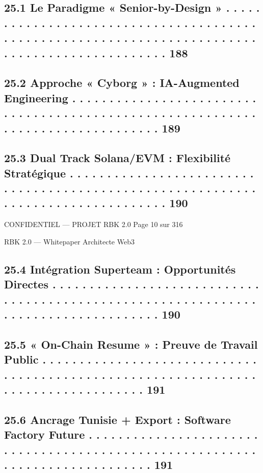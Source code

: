 \documentclass[12pt,landscape,a4paper]{article}
\newenvironment{confidential}
{\begin{tcolorbox}[
    colback=rbkred!5!white,
    colframe=rbkred!75!black,
    title=CONFIDENTIEL,
    fonttitle=\bfseries\color{white},
    coltitle=rbkred!75!black,
    breakable,
    enhanced,
    frame hidden,
    borderline west={2pt}{0pt}{rbkred!75!black}
]}
{\end{tcolorbox}}
\begin{document}
\subsection{25.1    Le Paradigme « Senior-by-Design » . . . . . . . . . . . . . . . . . . . . . . . . . . . . . . . . . . . . . . . . . . . . . . . . . . . . . . . . . . . . . . . . . . . . . . . . . . . . . . . . . . . . . . . . . . . . . . . 188}
\subsection{25.2    Approche « Cyborg » : IA-Augmented Engineering . . . . . . . . . . . . . . . . . . . . . . . . . . . . . . . . . . . . . . . . . . . . . . . . . . . . . . . . . . . . . . . . . . . . . . . . . . . . . . . . 189}
\subsection{25.3    Dual Track Solana/EVM : Flexibilité Stratégique . . . . . . . . . . . . . . . . . . . . . . . . . . . . . . . . . . . . . . . . . . . . . . . . . . . . . . . . . . . . . . . . . . . . . . . . . . . . . . . . . 190}
\vspace{0.5em}
\vspace{0.5em}
\begin{confidential}CONFIDENTIEL — PROJET RBK 2.0                                                                                  Page 10 sur 316\end{confidential}
RBK 2.0 — Whitepaper Architecte Web3\\
\vspace{0.5em}
\vspace{0.5em}
\subsection{25.4    Intégration Superteam : Opportunités Directes . . . . . . . . . . . . . . . . . . . . . . . . . . . . . . . . . . . . . . . . . . . . . . . . . . . . . . . . . . . . . . . . . . . . . . . . . . . . . . . . . . . 190}
\subsection{25.5    « On-Chain Resume » : Preuve de Travail Public . . . . . . . . . . . . . . . . . . . . . . . . . . . . . . . . . . . . . . . . . . . . . . . . . . . . . . . . . . . . . . . . . . . . . . . . . . . . . . . . . . 191}
\subsection{25.6    Ancrage Tunisie + Export : Software Factory Future . . . . . . . . . . . . . . . . . . . . . . . . . . . . . . . . . . . . . . . . . . . . . . . . . . . . . . . . . . . . . . . . . . . . . . . . . . . . . 191}
\end{document}
